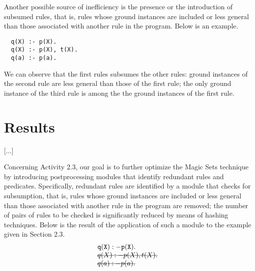\documentclass[oneside]{book}
\newcommand{\stkout}[1]{\ifmmode\text{\sout{\ensuremath{#1}}}\else\sout{#1}\fi}
\begin{document}
Another possible source of inefficiency is the presence or the introduction of subsumed rules, that is, rules whose ground instances are included or less general than those associated with another rule in the program. Below is an example.
\begin{verbatim}
  q(X) :- p(X).
  q(X) :- p(X), t(X).
  q(a) :- p(a).
\end{verbatim}
We can observe that the first rules subsumes the other rules: ground instances of the second rule are less general than those of the first rule; the only ground instance of the third rule is among the the ground instances of the first rule.

\chapter{Results}
[...]

Concerning Activity 2.3, our goal is to further optimize the Magic Sets technique by introducing postprocessing modules that identify redundant rules and predicates. Specifically, redundant rules are identified by a module that checks for subsumption, that is, rules whose ground instances are included or less general than those associated with another rule in the program are removed; the number of pairs of rules to be checked is significantly reduced by means of hashing techniques. Below is the result of the application of such a module to the example given in Section 2.3. 
\[
\begin{array}{l}
{\tt q(X) :- p(X).}\\
\mathtt{\stkout{q(X) :- p(X), t(X).}}\\
\mathtt{\stkout{ q(a) :- p(a).}}\\
\end{array}
\]
\end{document}
